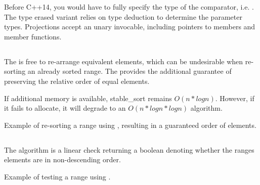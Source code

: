 Before C++14, you would have to fully specify the type of the comparator, i.e. . The type erased variant  relies on type deduction to determine the parameter types. Projections accept an unary invocable, including pointers to members and member functions.

\subsection{\texorpdfstring{}{\texttt{std::stable\_sort}}}

The  is free to re-arrange equivalent elements, which can be undesirable when re-sorting an already sorted range. The  provides the additional guarantee of preserving the relative order of equal elements.


If additional memory is available, stable\_sort remains $O(n*logn)$. However, if it fails to allocate, it will degrade to an $O(n*logn*logn)$ algorithm.

\begin{codebox}[]{\href{https://compiler-explorer.com/z/TKx8qP8bK}{\ExternalLink}}
\footnotesize Example of re-sorting a range using , resulting in a guaranteed order of elements.
\tcblower
{}
\end{codebox}

\subsection{\texorpdfstring{}{\texttt{std::is\_sorted}}}

The  algorithm is a linear check returning a boolean denoting whether the ranges elements are in non-descending order.


\begin{codebox}[]{\href{https://compiler-explorer.com/z/T3n9bfqdM}{\ExternalLink}}
\footnotesize Example of testing a range using .
\tcblower
{}
\end{codebox}

